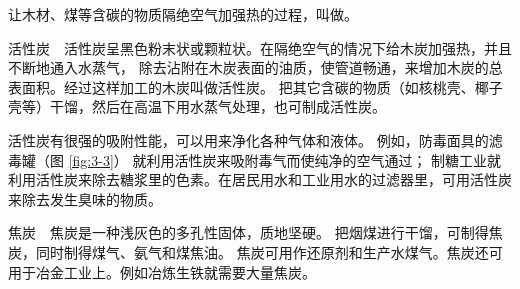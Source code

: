 让木材、煤等含碳的物质隔绝空气加强热的过程，叫做。

活性炭　活性炭呈黑色粉末状或颗粒状。在隔绝空气的情况下给木炭加强热，并且不断地通入水蒸气，
除去沾附在木炭表面的油质，使管道畅通，来增加木炭的总表面积。经过这样加工的木炭叫做活性炭。
把其它含碳的物质（如核桃壳、椰子壳等）干馏，然后在高温下用水蒸气处理，也可制成活性炭。

活性炭有很强的吸附性能，可以用来净化各种气体和液体。
例如，防毒面具的滤毒罐（图 \ref{fig:3-3}） 就利用活性炭来吸附毒气而使纯净的空气通过；
制糖工业就利用活性炭来除去糖浆里的色素。在居民用水和工业用水的过滤器里，可用活性炭来除去发生臭味的物质。

焦炭　焦炭是一种浅灰色的多孔性固体，质地坚硬。
把烟煤进行干馏，可制得焦炭，同时制得煤气、氨气和煤焦油。
焦炭可用作还原剂和生产水煤气。焦炭还可用于冶金工业上。例如冶炼生铁就需要大量焦炭。


\begin{xiti}


\begin{xiaoxiaotis}




\end{xiaoxiaotis}


\begin{xiaoxiaotis}



\end{xiaoxiaotis}

\end{xiti}

